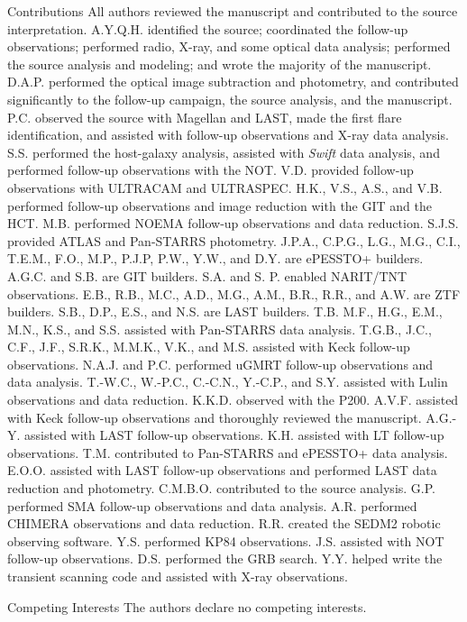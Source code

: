 \documentclass{nature_plusfigure}
\begin{document}
\begin{addendum}
\item[Contributions] 
All authors reviewed the manuscript and contributed to the source interpretation.
A.Y.Q.H. identified the source; coordinated the follow-up observations; performed radio, X-ray, and some optical data analysis; performed the source analysis and modeling; and wrote the majority of the manuscript. D.A.P. performed the optical image subtraction and photometry, and contributed significantly to the follow-up campaign, the source analysis, and the manuscript. P.C. observed the source with Magellan and LAST, made the first flare identification, and assisted with follow-up observations and X-ray data analysis. S.S. performed the host-galaxy analysis, assisted with {\it Swift} data analysis, and performed follow-up observations with the NOT. V.D. provided follow-up observations with ULTRACAM and ULTRASPEC. H.K., V.S., A.S., and V.B. performed follow-up observations and image reduction with the GIT and the HCT. M.B. performed NOEMA follow-up observations and data reduction. S.J.S. provided ATLAS and Pan-STARRS photometry. J.P.A., C.P.G., L.G., M.G., C.I., T.E.M., F.O., M.P., P.J.P, P.W., Y.W., and D.Y. are ePESSTO+ builders. A.G.C. and S.B. are GIT builders. S.A. and S. P. enabled NARIT/TNT observations. E.B., R.B., M.C., A.D., M.G., A.M., B.R., R.R., and A.W. are ZTF builders. S.B., D.P., E.S., and N.S. are LAST builders. T.B. M.F., H.G., E.M., M.N., K.S., and S.S. assisted with Pan-STARRS data analysis. T.G.B., J.C., C.F., J.F., S.R.K., M.M.K., V.K., and M.S. assisted with Keck follow-up observations. N.A.J. and P.C. performed uGMRT follow-up observations and data analysis. T.-W.C., W.-P.C., C.-C.N., Y.-C.P., and S.Y. assisted with Lulin observations and data reduction. K.K.D. observed with the P200. A.V.F. assisted with Keck follow-up observations and thoroughly reviewed the manuscript. A.G.-Y. assisted with LAST follow-up observations. K.H. assisted with LT follow-up observations. T.M. contributed to Pan-STARRS and ePESSTO+ data analysis. E.O.O. assisted with LAST follow-up observations and performed LAST data reduction and photometry. C.M.B.O. contributed to the source analysis. G.P. performed SMA follow-up observations and data analysis. A.R. performed CHIMERA observations and data reduction. R.R. created the SEDM2 robotic observing software. Y.S. performed KP84 observations. J.S. assisted with NOT follow-up observations. D.S. performed the GRB search. Y.Y. helped write the transient scanning code and assisted with X-ray observations.

 \item[Competing Interests] The authors declare no competing interests.


\end{addendum}
\end{document}
